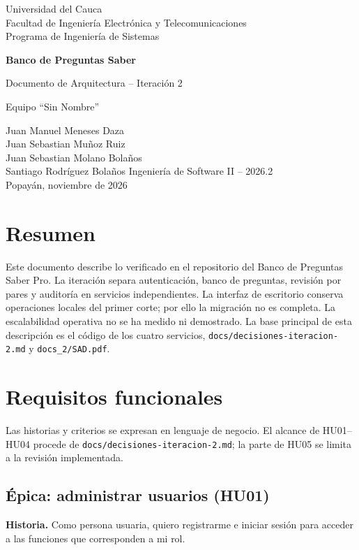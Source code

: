 \documentclass[12pt,a4paper]{article}
\begin{document}
\begin{titlepage}
\centering
{\Large Universidad del Cauca\\Facultad de Ingeniería Electrónica y Telecomunicaciones\\Programa de Ingeniería de Sistemas\par}
\vspace{2cm}
{\huge\bfseries Banco de Preguntas Saber\par}
\vspace{0.5cm}
{\Large Documento de Arquitectura -- Iteración 2\par}
\vspace{1cm}
{Equipo ``Sin Nombre''\par}
\vspace{0.4cm}
Juan Manuel Meneses Daza\\Juan Sebastian Muñoz Ruiz\\Juan Sebastian Molano Bolaños\\Santiago Rodríguez Bolaños
\vfill
Ingeniería de Software II -- 2026.2\\Popayán, noviembre de 2026
\end{titlepage}
\tableofcontents\newpage

\section{Resumen}
Este documento describe lo verificado en el repositorio del Banco de Preguntas Saber Pro. La iteración separa autenticación, banco de preguntas, revisión por pares y auditoría en servicios independientes. La interfaz de escritorio conserva operaciones locales del primer corte; por ello la migración no es completa. La escalabilidad operativa no se ha medido ni demostrado. La base principal de esta descripción es el código de los cuatro servicios, \texttt{docs/decisiones-iteracion-2.md} y \texttt{docs\_2/SAD.pdf}.

\section{Requisitos funcionales}
Las historias y criterios se expresan en lenguaje de negocio. El alcance de HU01--HU04 procede de \texttt{docs/decisiones-iteracion-2.md}; la parte de HU05 se limita a la revisión implementada.

\subsection{Épica: administrar usuarios (HU01)}
\textbf{Historia.} Como persona usuaria, quiero registrarme e iniciar sesión para acceder a las funciones que corresponden a mi rol.
\end{document}
